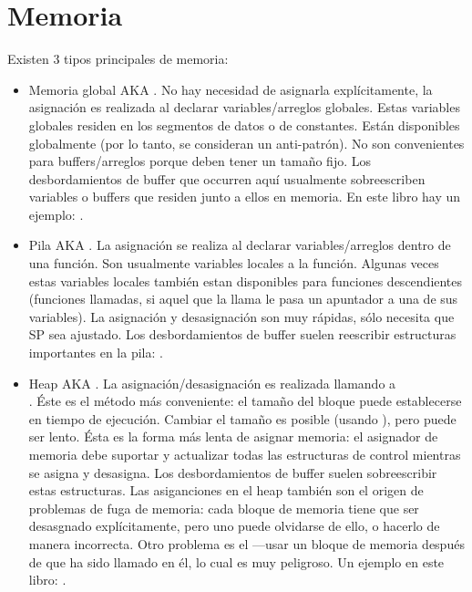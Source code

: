 ﻿%
\section{Memoria}

Existen 3 tipos principales de memoria:

\begin{itemize}
\item
Memoria global \ac{AKA} .
No hay necesidad de asignarla expl\'icitamente, la asignaci\'on es realizada al declarar
variables/arreglos globales.
Estas variables globales residen en los segmentos de datos o de constantes.
Est\'an disponibles globalmente (por lo tanto, se consideran un anti-patr\'on).
No son convenientes para buffers/arreglos porque deben tener un tama\~no fijo.
Los desbordamientos de buffer que occurren aqu\'i usualmente sobreescriben variables o buffers que residen
junto a ellos en memoria.
En este libro hay un ejemplo: .

\item
Pila \ac{AKA} .
La asignaci\'on se realiza al declarar variables/arreglos dentro de una funci\'on.
Son usualmente variables locales a la funci\'on.
Algunas veces estas variables locales tambi\'en estan disponibles para funciones descendientes
(funciones llamadas, si aquel que la llama le pasa un apuntador a una de sus variables).
La asignaci\'on y desasignaci\'on son muy r\'apidas, s\'olo necesita que \ac{SP} sea ajustado.
\ESph{}
Los desbordamientos de buffer suelen reescribir estructuras importantes en la pila: .

\item
Heap \ac{AKA} .
La asignaci\'on/desasignaci\'on es realizada llamando a \\
 \ESph{}  \ESph{} \Cpp.
\'Este es el m\'etodo m\'as conveniente: el tama\~no del bloque puede establecerse en tiempo de ejecuci\'on.
Cambiar el tama\~no es posible (usando ), pero puede ser lento.
\'Esta es la forma m\'as lenta de asignar memoria:
el asignador de memoria debe suportar y actualizar todas las estructuras de control
mientras se asigna y desasigna.
Los desbordamientos de buffer suelen sobreescribir estas estructuras.
Las asiganciones en el heap tambi\'en son el origen de problemas de fuga de memoria: cada bloque de memoria tiene
que ser desasgnado expl\'icitamente, pero uno puede olvidarse de ello, o hacerlo de manera incorrecta.
Otro problema es el ---usar un bloque de memoria despu\'es
de que  ha sido llamado en \'el, lo cual es muy peligroso.
Un ejemplo en este libro:
.

\end{itemize}
